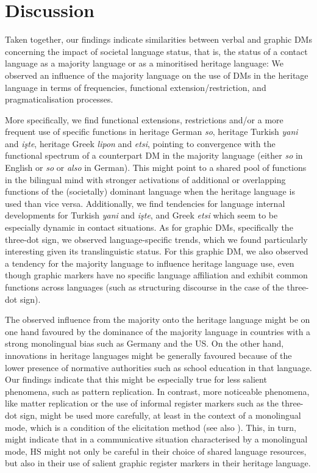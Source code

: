 \documentclass[output=paper,colorlinks,citecolor=brown]{langscibook}
\begin{document}
\section{Discussion}
\label{sec:labrenzetal:Discussion}

Taken together, our findings indicate similarities between verbal and graphic DMs concerning the impact of societal language status, that is, the status of a contact language as a majority language or as a minoritised heritage language: We observed an influence of the majority language on the use of DMs in the heritage language in terms of frequencies, functional extension/restriction, and pragmaticalisation processes. 

More specifically, we find functional extensions, restrictions and/or a more frequent use of specific functions in heritage German \textit{so}, heritage Turkish \textit{yani} and \textit{işte}, heritage Greek \textit{lipon} and \textit{etsi}, pointing to convergence with the functional spectrum of a counterpart DM in the majority language (either \textit{so} in English or \textit{so} or \textit{also} in German). This might point to a shared pool of functions in the bilingual mind with stronger activations of additional or overlapping functions of the (societally) dominant language when the heritage language is used than vice versa. Additionally, we find tendencies for language internal developments for Turkish \textit{yani} and \textit{işte}, and Greek \textit{etsi} which seem to be especially dynamic in contact situations. As for graphic DMs, specifically the three-dot sign, we observed language-specific trends, which we found particularly interesting given its translinguistic status. For this graphic DM, we also observed a tendency for the majority language to influence heritage language use, even though graphic markers have no specific language affiliation and exhibit common functions across languages (such as structuring discourse in the case of the three-dot sign).

The observed influence from the majority onto the heritage language might be on one hand favoured by the dominance of the majority language in countries with a strong monolingual bias such as Germany and the US. On the other hand, innovations in heritage languages might be generally favoured because of the lower presence of normative authorities such as school education in that language. Our findings indicate that this might be especially true for less salient phenomena, such as pattern replication. In contrast, more noticeable phenomena, like matter replication or the use of informal register markers such as the three-dot sign, might be used more carefully, at least in the context of a monolingual mode, which is a condition of the elicitation method (see also \cite{chapters/02}). This, in turn, might indicate that in a communicative situation characterised by a monolingual mode, HS might not only be careful in their choice of shared language resources, but also in their use of salient graphic register markers in their heritage language.
\end{document}
